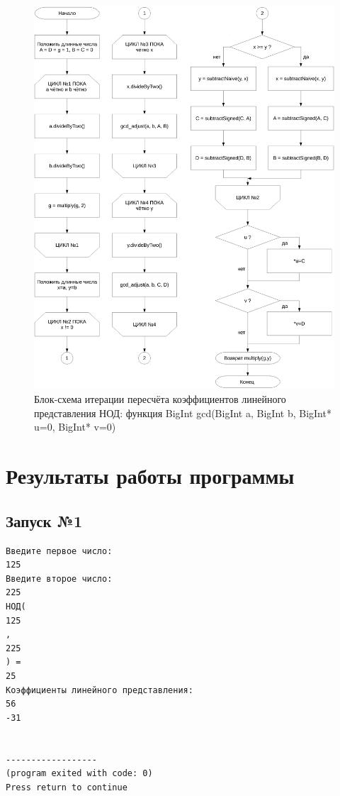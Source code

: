 \documentclass[a4paper,12pt]{article} %
\begin{document}
\begin{figure}[ht]
	\includegraphics[width=\textwidth]{lr4_gcd.pdf}
	\caption{
		Блок-схема итерации пересчёта коэффициентов линейного представления НОД:
		функция BigInt gcd(BigInt a, BigInt b, BigInt* u=0, BigInt* v=0)
	}
	\label{bs_gcd}
\end{figure}

\clearpage

\section*{Результаты работы программы}

\subsection*{Запуск №1}

\begin{verbatim}
Введите первое число:
125
Введите второе число:
225
НОД(
125
,
225
) =
25
Коэффициенты линейного представления:
56
-31


------------------
(program exited with code: 0)
Press return to continue
\end{verbatim}
\end{document}
